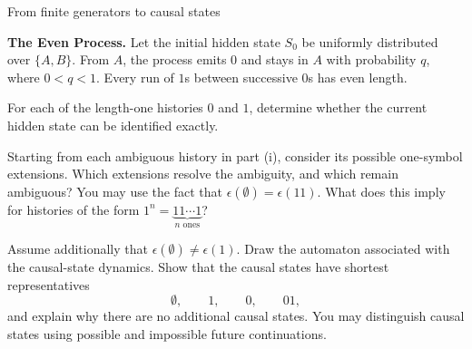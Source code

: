 \begin{exercise}[Extension]{From finite generators to causal states}
\begin{parts}
\begin{subparts}
      \end{subparts}

    \item \textbf{The Even Process.}
      Let the initial hidden state $S_0$ be uniformly distributed over $\{A,B\}$.
      From $A$, the process emits $0$ and stays in $A$ with probability $q$, where $0<q<1$.
      Every run of $1$s between successive $0$s has even length.
      \par\nobreak
      {\centering
        \par}

      \begin{subparts}
        \item For each of the length-one histories $0$ and $1$, determine
          whether the current hidden state can be identified exactly.

        \item Starting from each ambiguous history in part (i), consider its
          possible one-symbol extensions. Which extensions resolve the
          ambiguity, and which remain ambiguous? You may use the fact that
          $\epsilon(\emptyset)=\epsilon(11)$. What does this imply for
          histories of the form \(1^n = \underbrace{11\cdots1}_{n\text{ ones}}\)?

        \item Assume additionally that
          $\epsilon(\emptyset)\neq\epsilon(1)$. Draw the automaton
          associated with the causal-state dynamics. Show that the causal
          states have shortest representatives
          \[
            \emptyset,\qquad 1,\qquad 0,\qquad 01,
          \]
          and explain why there are no additional causal states. You may
          distinguish causal states using possible and impossible future
          continuations.
      \end{subparts}


\end{parts}
\end{exercise}
